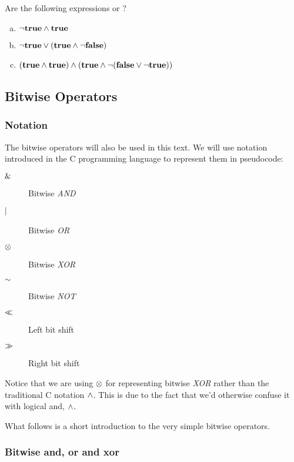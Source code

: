 \begin{Exercise}[label={boolean}]
  Are the following expressions \True or \False?

  \begin{enumerate}[(a)]
  \item $\neg \textbf{true} \wedge \textbf{true}$
  \item $\neg \textbf{true} \vee (\textbf{true} \wedge \neg \textbf{false})$

  \item $(\textbf{true} \wedge \textbf{true}) \wedge (\textbf{true} \wedge \neg(\textbf{false} \vee \neg \textbf{true}))$

  \end{enumerate}
\end{Exercise}

\subsection{Bitwise Operators}
\label{sec:bitwise-operators}

\subsubsection{Notation}

The bitwise operators will also be used in this text. We will use
notation introduced in the C programming language\cite{kernighan1988c}
to represent them in pseudocode:

\begin{description}
\item[$\mathrel{\&}$] Bitwise \textit{AND}
\item[$\mathrel{|}$] Bitwise \textit{OR}
\item[$\mathrel{\otimes}$] Bitwise \textit{XOR}
\item[$\mathord{\sim}$] Bitwise \textit{NOT}
\item[$\ll$] Left bit shift
\item[$\gg$] Right bit shift
\end{description}

Notice that we are using $\mathrel{\otimes}$ for representing bitwise
\textit{XOR} rather than the traditional C notation $\wedge$. This is due to
the fact that we'd otherwise confuse it with logical and, $\wedge$.

What follows is a short introduction to the very simple bitwise
operators.

\subsubsection{Bitwise and, or and xor}

